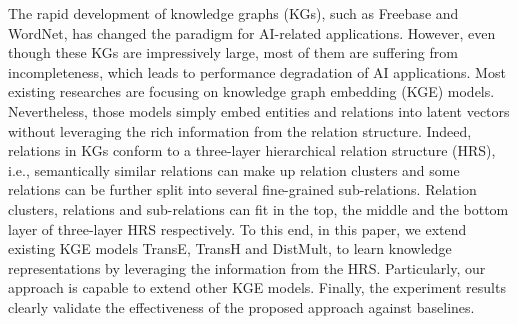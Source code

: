 The rapid development of knowledge graphs (KGs), such as Freebase and WordNet, has changed the paradigm for AI-related applications. However, even though these KGs are impressively large, most of them are suffering from incompleteness, which leads to performance degradation of AI applications. Most existing researches are focusing on knowledge graph embedding (KGE) models. Nevertheless, those models simply embed entities and relations into latent vectors without leveraging the rich information from the relation structure. Indeed, relations in KGs conform to a three-layer hierarchical relation structure (HRS), i.e., semantically similar relations can make up relation clusters and some relations can be further split into several fine-grained sub-relations. Relation clusters, relations and sub-relations can fit in the top, the middle and the bottom layer of three-layer HRS respectively. To this end, in this paper, we extend existing KGE models TransE, TransH and DistMult, to learn knowledge representations by leveraging the information from the HRS. Particularly, our approach is capable to extend other KGE models. Finally, the experiment results clearly validate the effectiveness of the proposed approach against baselines.
